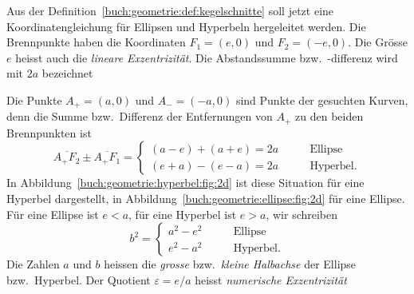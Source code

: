Aus der Definition~\ref{buch:geometrie:def:kegelschnitte} soll jetzt
eine Koordinatengleichung für Ellipsen und Hyperbeln hergeleitet werden.
Die Brennpunkte haben die Koordinaten $F_1=(e,0)$ und $F_2=(-e,0)$.
Die Grösse $e$ heisst auch die {\em lineare Exzentrizität}.
%
%
Die Abstandssumme bzw.~-differenz wird mit $2a$ bezeichnet

Die Punkte $A_+=(a,0)$ und $A_-=(-a,0)$ sind Punkte der gesuchten
Kurven,
denn die Summe bzw.~Differenz der Entfernungen von $A_+$ zu den beiden
Brennpunkten ist
\[
\overline{A_+F_2}
\pm
\overline{A_+F_1}
=
\begin{cases}
(a-e)+(a+e) = 2a
&\qquad\text{Ellipse}
\\
(e+a)-(e-a) = 2a
&\qquad\text{Hyperbel.}
\end{cases}
\]
In Abbildung~\ref{buch:geometrie:hyperbel:fig:2d} ist diese Situation
für eine Hyperbel dargestellt, in 
Abbildung~\ref{buch:geometrie:ellipse:fig:2d} für eine Ellipse.
Für eine Ellipse ist $e<a$, für eine Hyperbel ist $e>a$, wir schreiben
\[
b^2
=
\begin{cases}
a^2-e^2&\qquad\text{Ellipse} \\
e^2-a^2&\qquad\text{Hyperbel.}
\end{cases}
\]
Die Zahlen $a$ und $b$ heissen die {\em grosse} bzw.~{\em kleine Halbachse}
der Ellipse bzw.~Hyperbel.
Der Quotient $\varepsilon = e/a$ heisst {\em numerische Exzentrizität}
%
%

